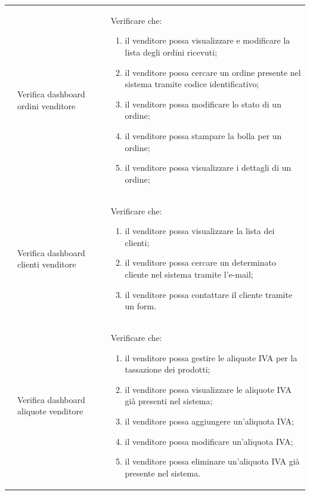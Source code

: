 \begin{center}
\begin{longtable}{|p{1cm}|p{4.85cm}|p{9cm}|}
		 & Verifica dashboard ordini venditore & Verificare che:
		\begin{enumerate}
			\item il venditore possa visualizzare e modificare la lista degli ordini ricevuti;
			\item il venditore possa cercare un ordine presente nel sistema tramite codice identificativo;
			\item il venditore possa modificare lo stato di un ordine;
			\item il venditore possa stampare la bolla per un ordine;
			\item il venditore possa visualizzare i dettagli di un ordine;
		\end{enumerate} \\

		 & Verifica dashboard clienti venditore & Verificare che:
		\begin{enumerate}
			\item il venditore possa visualizzare la lista dei clienti;
			\item il venditore possa cercare un determinato cliente nel sistema tramite l'e-mail;
			\item il venditore possa contattare il cliente tramite un form.
		\end{enumerate} \\

		 & Verifica dashboard aliquote venditore & Verificare che:
		\begin{enumerate}
			\item il venditore possa gestire le aliquote IVA per la tassazione dei prodotti;
			\item il venditore possa visualizzare le aliquote IVA già presenti nel sistema;
			\item il venditore possa aggiungere un'aliquota IVA;
			\item il venditore possa modificare un'aliquota IVA;
			\item il venditore possa eliminare un'aliquota IVA già presente nel sistema.
		\end{enumerate} \\


\end{longtable}
\end{center}

